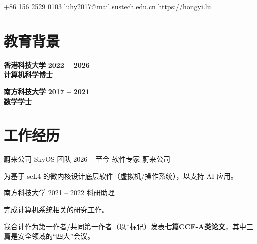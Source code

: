 \documentclass{resume}
\begin{document}
\begin{center}
	\contact
	{+86 156 2529 0103}
	{\href{mailto://luhy2017@mail.sustech.edu.cn}{luhy2017@mail.sustech.edu.cn}}
	{\href{https://hongyi.lu}{https://hongyi.lu}}
\end{center}

\section{\textbf{教育背景}}
\begin{content}
	{\textbf{香港科技大学}}
	\hfill {\textbf{2022 -- 2026}}
	\\ \textbf{计算机科学博士}

	\textbf{南方科技大学} \hfill \textbf{2017 -- 2021} \\
	\textbf{数学学士} \hfill

	\sectionlineskip
\end{content}

\section{\textbf{工作经历}}
\begin{content}
	\begin{position}
		{蔚来公司 SkyOS 团队}
		{2026 -- 至今}
		{软件专家}
		{}
		{蔚来公司}
		\item 为基于 seL4 的微内核设计底层软件（虚拟机/操作系统），以支持 AI 应用。
	\end{position}

	\begin{position}
		{南方科技大学}
		{2021 -- 2022}
		{科研助理}
		{}
		{}
		\item 完成计算机系统相关的研究工作。
	\end{position}

	\sectionlineskip
\end{content}
\vspace{-3\medskipamount}

\noindent
\renewcommand{\refname}{\textbf{学术发表}}   %
\nocite{*}
\sectionlineskip

我合计作为第一作者/共同第一作者（以*标记）发表\textbf{七篇CCF-A类论文}，其中三篇是安全领域的“四大”会议。
\end{document}

